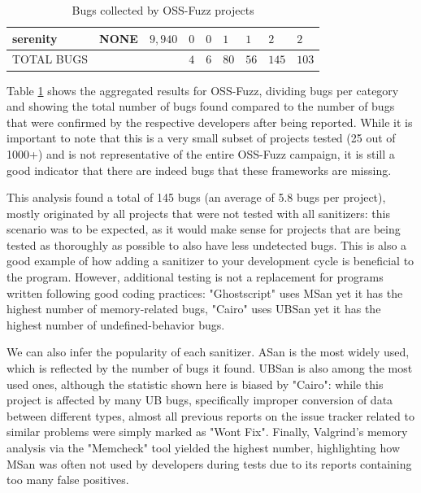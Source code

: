 \begin{table}[h!]
{\begin{tabular}{|l|l|l|l|l|l|l|l|l|}
serenity         & NONE                & $9,940$             & $0$              & $0$           & $1$           & $1$            & $2$             & $2$                 \\
\hline
TOTAL BUGS   &   &   &$4$   &$6$   &$80$   &$56$   &$145$   &$103$       \\
\hline
\end{tabular}}
\vspace{10pt}
\caption{Bugs collected by OSS-Fuzz projects}
\label{ossfuzz-table}
\end{table}
Table \ref{ossfuzz-table} shows the aggregated results for OSS-Fuzz, dividing bugs per category and showing the total number of bugs found compared to the number of bugs that were confirmed by the respective developers after being reported. While it is important to note that this is a very small subset of projects tested (25 out of 1000+) and is not representative of the entire OSS-Fuzz campaign, it is still a good indicator that there are indeed bugs that these frameworks are missing.

This analysis found a total of 145 bugs (an average of 5.8 bugs per project), mostly originated by all projects that were not tested with all sanitizers: this scenario was to be expected, as it would make sense for projects that are being tested as thoroughly as possible to also have less undetected bugs. This is also a good example of how adding a sanitizer to your development cycle is beneficial to the program. However, additional testing is not a replacement for programs written following good coding practices: "Ghostscript" uses MSan yet it has the highest number of memory-related bugs, "Cairo" uses UBSan yet it has the highest number of undefined-behavior bugs. 

We can also infer the popularity of each sanitizer. ASan is the most widely used, which is reflected by the number of bugs it found. UBSan is also among the most used ones, although the statistic shown here is biased by "Cairo": while this project is affected by many UB bugs, specifically improper conversion of data between different types, almost all previous reports on the issue tracker related to similar problems were simply marked as "Wont Fix". Finally, Valgrind's memory analysis via the "Memcheck" tool yielded the highest number, highlighting how MSan was often not used by developers during tests due to its reports containing too many false positives.



